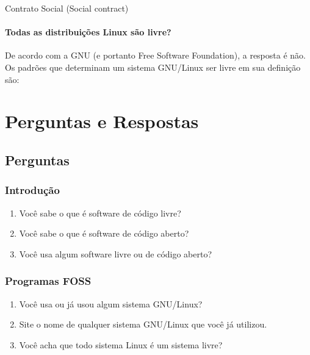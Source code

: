 \documentclass[12pt, a4paper]{report}
\begin{document}
Contrato Social (Social contract) 

\subsubsection{Todas as distribuições Linux são livre?}

De acordo com a GNU (e portanto Free Software Foundation), a resposta é não. Os padrões que determinam um sistema GNU/Linux ser livre em sua definição são:


\chapter{Perguntas e Respostas}

\section{Perguntas}

\subsection{Introdução}

\begin{enumerate}

  \item Você sabe o que é software de código livre? 

  \item Você sabe o que é software de código aberto? 

  \item Você usa algum software livre ou de código aberto? 

\end{enumerate}

\subsection{Programas FOSS}

\begin{enumerate}

  \item Você usa ou já usou algum sistema GNU/Linux? 

  \item Site o nome de qualquer sistema GNU/Linux que você já utilizou. 

  \item Você acha que todo sistema Linux é um sistema livre? 

\end{enumerate}
\end{document}
